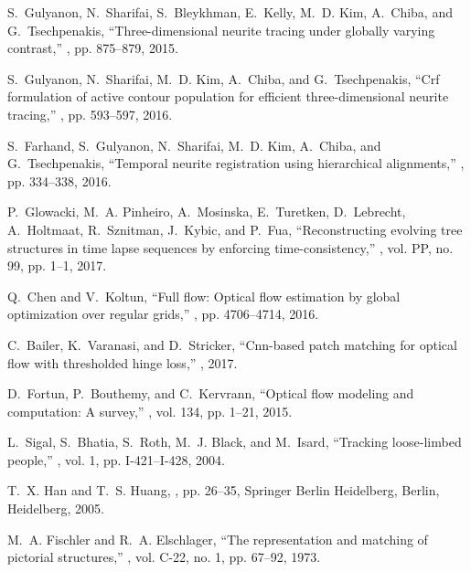 \documentclass{article}
\begin{document}
\small{
\begin{thebibliography}{9}
		
S.~Gulyanon, N.~Sharifai, S.~Bleykhman, E.~Kelly, M.~D. Kim, A.~Chiba, and G.~Tsechpenakis,
\newblock ``Three-dimensional neurite tracing under globally varying contrast,''
, pp. 875--879, 2015.

S.~Gulyanon, N.~Sharifai, M.~D. Kim, A.~Chiba, and G.~Tsechpenakis,
\newblock ``Crf formulation of active contour population for efficient three-dimensional neurite tracing,''
, pp. 593--597, 2016.

S.~Farhand, S.~Gulyanon, N.~Sharifai, M.~D. Kim, A.~Chiba, and G.~Tsechpenakis,
\newblock ``Temporal neurite registration using hierarchical alignments,''
, pp. 334--338, 2016.

P.~Glowacki, M.~A. Pinheiro, A.~Mosinska, E.~Turetken, D.~Lebrecht, A.~Holtmaat, R.~Sznitman, J.~Kybic, and P.~Fua,
\newblock ``Reconstructing evolving tree structures in time lapse sequences by enforcing time-consistency,''
, vol. PP, no. 99, pp. 1--1, 2017.

Q.~Chen and V.~Koltun,
\newblock ``Full flow: Optical flow estimation by global optimization over
regular grids,''
, pp. 4706--4714, 2016.

C.~Bailer, K.~Varanasi, and D.~Stricker,
\newblock ``Cnn-based patch matching for optical flow with thresholded hinge loss,''
, 2017.

D.~Fortun, P.~Bouthemy, and C.~Kervrann,
\newblock ``Optical flow modeling and computation: A survey,''
, vol. 134, pp. 1--21, 2015.

L.~Sigal, S.~Bhatia, S.~Roth, M.~J. Black, and M.~Isard,
\newblock ``Tracking loose-limbed people,''
, vol. 1, pp. I-421--I-428, 2004.

T.~X. Han and T.~S. Huang,
, pp.
26--35,
\newblock Springer Berlin Heidelberg, Berlin, Heidelberg, 2005.

M.~A. Fischler and R.~A. Elschlager,
\newblock ``The representation and matching of pictorial structures,''
, vol. C-22, no. 1, pp. 67--92, 1973.


\end{thebibliography}}
\end{document}
